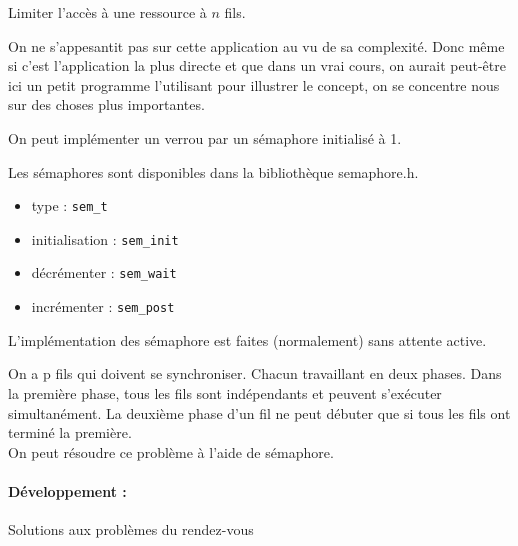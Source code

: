 \begin{appl}
	Limiter l'accès à une ressource à $n$ fils.
\end{appl}

\begin{com}
	On ne s’appesantit pas sur cette application au vu de sa complexité. Donc même si c'est l'application la plus directe et que dans un vrai cours, on aurait peut-être ici un petit programme l'utilisant pour illustrer le concept, on se concentre nous sur des choses plus importantes.
\end{com}

\begin{rem}
	On peut implémenter un verrou par un sémaphore initialisé à 1.
\end{rem}

\begin{impl}
	Les sémaphores sont disponibles dans la bibliothèque semaphore.h.
	\begin{itemize}
		\item type : \texttt{sem\_t}
		\item initialisation : \texttt{sem\_init}
		\item décrémenter : \texttt{sem\_wait}
		\item incrémenter : \texttt{sem\_post}
	\end{itemize}
\end{impl}

\begin{proposition}
	L'implémentation des sémaphore est faites (normalement) sans attente active.
\end{proposition}

\begin{appl}
	On a p fils qui doivent se synchroniser. Chacun travaillant en deux phases. Dans la première phase, tous les fils sont indépendants et peuvent s’exécuter simultanément. La deuxième phase d'un fil ne peut débuter que si tous les fils ont terminé la première.\\
	
	On peut résoudre ce problème à l'aide de sémaphore.
\end{appl}

\paragraph{Développement :} Solutions aux problèmes du rendez-vous

